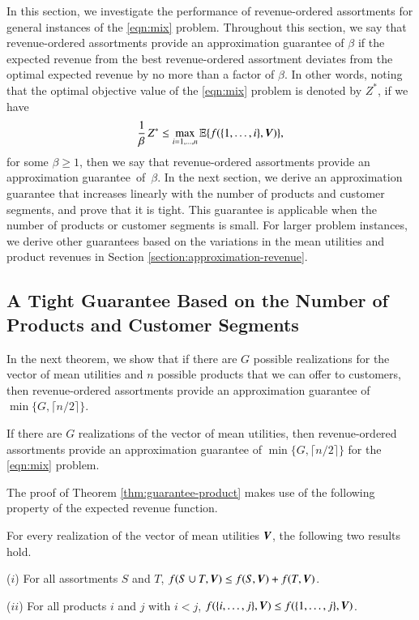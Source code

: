 In this section, we investigate the performance of revenue-ordered assortments for general instances of the \ref{eqn:mix} problem. Throughout this section, we say that revenue-ordered assortments provide an approximation guarantee of $\beta$ if the expected revenue from the best revenue-ordered assortment deviates from the optimal expected revenue by no more than a factor of $\beta$. In other words, noting that the optimal objective value of the \ref{eqn:mix} problem is denoted by $Z^*$, if we have 
%
%
\begin{align*}
\frac{1}{\beta} {\,} Z^* \leq \max_{i =1,\ldots,n} \mathbb E \{ f(\{1,\ldots,i\},{\bm V})\},
\end{align*}
%
%
for some $\beta \geq 1$, then we say that revenue-ordered assortments provide an approximation guarantee~of~$\beta$.  In the next section, we derive an approximation guarantee that increases linearly with the number of products and customer segments, and prove that it is tight.  This guarantee is applicable when the number of products or customer segments is small. For larger problem instances, we derive other guarantees based on the variations in the mean utilities and product revenues in Section \ref{section:approximation-revenue}.

\subsection{A Tight Guarantee Based on the Number of Products and Customer Segments}
\label{section:approximation-product}

In the next theorem, we show that if there are $G$ possible realizations for the vector of mean utilities and $n$ possible products that we can offer to customers, then revenue-ordered assortments provide an approximation guarantee of $\min\{ G, \lceil n/2 \rceil \}$.

\begin{theorem}
\label{thm:guarantee-product}
If there are $G$ realizations of the vector of mean utilities, then revenue-ordered assortments provide an approximation guarantee of $\min\{ G, \lceil n/2 \rceil \}$ for the \ref{eqn:mix} problem.
\end{theorem}

The proof of Theorem \ref{thm:guarantee-product} makes use of the following property of the expected revenue function.

\begin{lemma}
\label{lem:app_n}
For every realization of the vector of mean utilities ${\bm V}$, the following two results hold.

\noindent \textup{($i$)} For all assortments $S$ and $T$,  $f(S \cup T ,{\bm V})\leq f(S,{\bm V})+ f(T,{\bm V})$.

\noindent \textup{($ii$)} For all products $i$ and $j$ with $i < j$, $f(\{i,\ldots,j\} ,{\bm V}) \leq f(\{1,\ldots,j\} ,{\bm V})$. 

\end{lemma}

